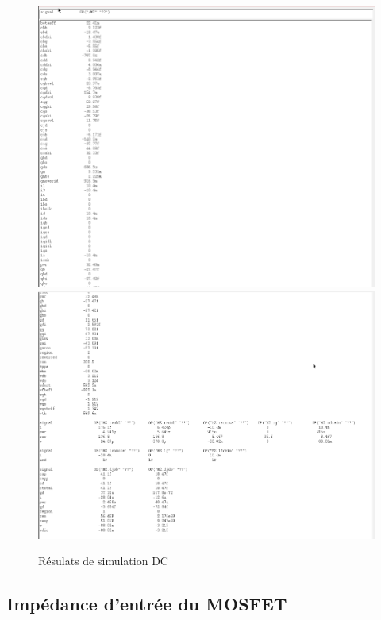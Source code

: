 \documentclass[a4paper]{article}
\begin{document}
\clearpage

\begin{figure}[!htb]
\begin{center}
  \includegraphics[scale=0.46]{Transistor-DC-1.png}
  \includegraphics[scale=0.40]{Transistor-DC-2.png}
  \caption{R\'esulats de simulation DC}
\end{center}
\end{figure}

\clearpage

\subsection{Imp\'edance d'entr\'ee du MOSFET}
\end{document}
